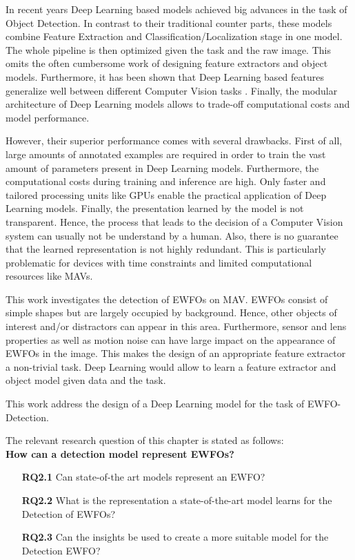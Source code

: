 	In recent years Deep Learning based models achieved big advances in the task of Object Detection. In contrast to their traditional counter parts, these models combine Feature Extraction and Classification/Localization stage in one model. The whole pipeline is then optimized given the task and the raw image. This omits the often cumbersome work of designing feature extractors and object models. Furthermore, it has been shown that Deep Learning based features generalize well between different Computer Vision tasks \cite{Razavian}. Finally, the modular architecture of Deep Learning models allows to trade-off computational costs and model performance.
	
	However, their superior performance comes with several drawbacks. First of all, large amounts of annotated examples are required in order to train the vast amount of parameters present in Deep Learning models. Furthermore, the computational costs during training and inference are high. Only faster and tailored processing units like \acp{GPU} enable the practical application of Deep Learning models. Finally, the presentation learned by the model is not transparent. Hence, the process that leads to the decision of a Computer Vision system can usually not be understand by a human. Also, there is no guarantee that the learned representation is not highly redundant. This is particularly problematic for devices with time constraints and limited computational resources like \acp{MAV}.
	
	This work investigates the detection of \acp{EWFO} on \ac{MAV}. \acp{EWFO} consist of simple shapes but are largely occupied by background. Hence, other objects of interest and/or distractors can appear in this area. Furthermore, sensor and lens properties as well as motion noise can have large impact on the appearance of \acp{EWFO} in the image. This makes the design of an appropriate feature extractor a non-trivial task. Deep Learning would allow to learn a feature extractor and object model given data and the task.
	
	This work address the design of a Deep Learning model for the task of \ac{EWFO}-Detection.
	
	The relevant research question of this chapter is stated as follows:\\
	\textbf{How can a detection model represent \acp{EWFO}?}
	
	\begin{enumerate}
		\item[\textbf{RQ2.1}] Can state-of-the art models represent an \ac{EWFO}?
		\item[\textbf{RQ2.2}] What is the representation a state-of-the-art model learns for the Detection of \acp{EWFO}?
		\item[\textbf{RQ2.3}] Can the insights be used to create a more suitable model for the Detection \ac{EWFO}?
	\end{enumerate}

